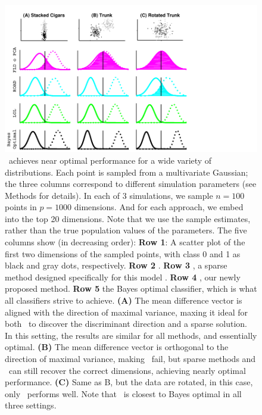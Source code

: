 \documentclass[10pt]{article}
\begin{document}
\begin{figure}%
\centering
\includegraphics[width=0.8\linewidth,trim=0in 0in 1.5in 0in,clip=true]{../Figs/cigars_est}%
\caption{
\Lol~achieves near optimal performance for a wide variety of distributions.
Each point is sampled from a multivariate Gaussian;
the three columns correspond to different simulation parameters (see Methods for details).
In each of 3 simulations, we sample $n=100$ points in $p=1000$ dimensions.  And for each approach, we embed into the top 20 dimensions. Note that we use the sample estimates, rather than the true population values of the parameters.  The five columns show (in decreasing order): 
\textbf{Row 1}: A scatter plot of the first two dimensions of the sampled points, with class 0 and 1 as black and gray dots, respectively.
\textbf{Row 2} .
\textbf{Row 3} \Road, a sparse method designed specifically for this model \cite{Fan2012a}.
\textbf{Row 4} \Lol, our newly proposed method.
\textbf{Row 5} the Bayes optimal classifier, which is what all classifiers strive to achieve.
\textbf{(A)} The mean difference vector is aligned with the direction of maximal variance, maxing it ideal for both \Pca~to discover the discriminant direction and a sparse solution. In this setting, the results are  similar for all methods, and essentially optimal.
\textbf{(B)} The mean difference vector is orthogonal to the direction of maximal variance, making \Pca~fail, but sparse methods and \Lol~can still recover the correct dimensions, achieving nearly optimal performance. 
\textbf{(C)} Same as B, but the data are rotated, in this case, only \Lol~performs well.
Note that \Lol~is closest to Bayes optimal in all three settings.
}
\label{f:cigars}
\end{figure}
\end{document}
